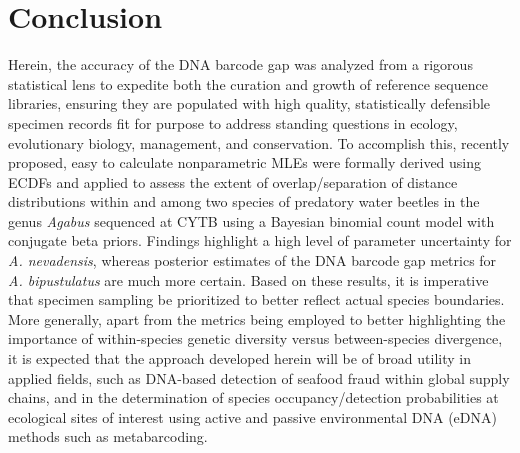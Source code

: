 \documentclass[12pt]{article}
\begin{document}
\section{Conclusion}

Herein, the accuracy of the DNA barcode gap was analyzed from a rigorous statistical lens to expedite both the curation and growth of reference sequence libraries, ensuring they are populated with high quality, statistically defensible specimen records fit for purpose to address standing questions in ecology, evolutionary biology, management, and conservation. To accomplish this, recently proposed, easy to calculate nonparametric MLEs were formally derived using ECDFs and applied to assess the extent of overlap/separation of distance distributions within and among two species of predatory water beetles in the genus \textit{Agabus} sequenced at CYTB using a Bayesian binomial count model with conjugate beta priors. Findings highlight a high level of parameter uncertainty for \textit{A. nevadensis}, whereas posterior estimates of the DNA barcode gap metrics for \textit{A. bipustulatus} are much more certain. Based on these results, it is imperative that specimen sampling be prioritized to better reflect actual species boundaries. More generally, apart from the metrics being employed to better highlighting the importance of within-species genetic diversity versus between-species divergence, it is expected that the approach developed herein will be of broad utility in applied fields, such as DNA-based detection of seafood fraud within global supply chains, and in the determination of species occupancy/detection probabilities at ecological sites of interest using active and passive environmental DNA (eDNA) methods such as metabarcoding.
\end{document}
